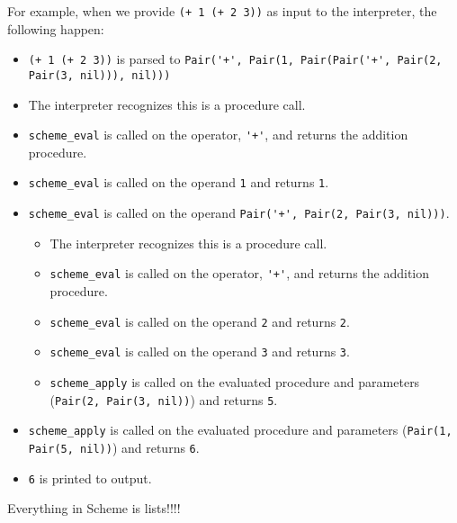 For example, when we provide \lstinline{(+ 1 (+ 2 3))} as input to the interpreter, the following happen: 
\begin{itemize}
    \item \lstinline{(+ 1 (+ 2 3))} is parsed to \lstinline{Pair('+', Pair(1, Pair(Pair('+', Pair(2, Pair(3, nil))), nil)))}
    \item The interpreter recognizes this is a procedure call. 
    \item \lstinline{scheme_eval} is called on the operator, \lstinline{'+'}, and returns the addition procedure.
    \item \lstinline{scheme_eval} is called on the operand \lstinline{1} and returns \lstinline{1}. 
    \item \lstinline{scheme_eval} is called on the operand \lstinline{Pair('+', Pair(2, Pair(3, nil)))}. 
    \begin{itemize}
        \item The interpreter recognizes this is a procedure call. 
        \item \lstinline{scheme_eval} is called on the operator, \lstinline{'+'}, and returns the addition procedure.
        \item \lstinline{scheme_eval} is called on the operand \lstinline{2} and returns \lstinline{2}. 
        \item \lstinline{scheme_eval} is called on the operand \lstinline{3} and returns \lstinline{3}. 
        \item \lstinline{scheme_apply} is called on the evaluated procedure and parameters (\lstinline{Pair(2, Pair(3, nil))}) and returns \lstinline{5}. 
    \end{itemize}
    \item \lstinline{scheme_apply} is called on the evaluated procedure and parameters (\lstinline{Pair(1, Pair(5, nil))}) and returns \lstinline{6}. 
    \item \lstinline{6} is printed to output. 
\end{itemize}
\begin{meta}
Everything in Scheme is lists!!!! 
\end{meta}